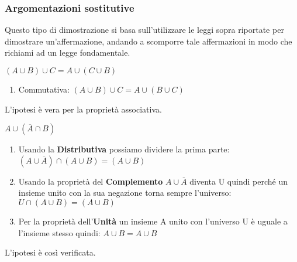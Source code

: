 \subsubsection{Argomentazioni sostitutive}
Questo tipo di dimostrazione si basa sull'utilizzare le leggi sopra riportate per dimostrare un'affermazione, andando a scomporre tale affermazioni in modo che richiami ad un legge fondamentale.
\begin{example}
    $(A \cup B) \cup C = A \cup (C \cup B)$
    \begin{enumerate}
        \item Commutativa: $(A \cup B) \cup C = A \cup (B \cup C)$
    \end{enumerate}
    L'ipotesi è vera per la proprietà associativa.
\end{example}
\begin{example}
    $A \cup (\overline{A} \cap B)$
    \begin{enumerate}
        \item Usando la \textbf{Distributiva} possiamo dividere la prima parte: $(A \cup \overline{A}) \cap (A \cup B) = (A \cup B)$
        \item Usando la proprietà del \textbf{Complemento} $A \cup \overline{A}$ diventa U quindi perché un insieme unito con la sua negazione torna sempre l'universo: $U \cap (A \cup B) = (A \cup B) $
        \item Per la proprietà dell'\textbf{Unità} un insieme A unito con l'universo U è uguale a l'insieme stesso quindi: $A \cup B = A \cup B$
    \end{enumerate}
    L'ipotesi è così verificata.
\end{example}
 

